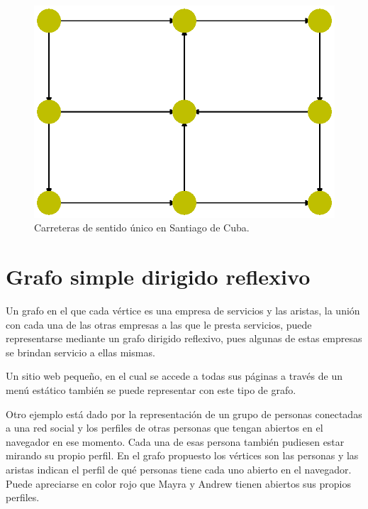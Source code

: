 \documentclass{article}
\begin{document}

\begin{figure}
  \includegraphics[width=.8\columnwidth]{5.eps}
  \caption{Carreteras de sentido único en Santiago de Cuba.}
  \label{fig:5}
\end{figure}
\newpage

\section{Grafo simple dirigido reflexivo}

Un grafo en el que cada vértice es una empresa de servicios y las aristas, la unión con cada una de las otras empresas a las que le presta servicios, puede representarse mediante un grafo dirigido reflexivo, pues algunas de estas empresas se brindan servicio a ellas mismas. 

Un sitio web pequeño, en el cual se accede a todas sus páginas a través de un menú estático también se puede representar con este tipo de grafo. 

Otro ejemplo está dado por la representación de un grupo de personas conectadas a una red social y los perfiles de otras personas que tengan abiertos en el navegador en ese momento. Cada una de esas persona también pudiesen estar mirando su propio
perfil. En el grafo propuesto los vértices son las personas y las aristas indican el perfil de qué personas tiene cada uno abierto en el navegador. Puede apreciarse en color rojo que Mayra y Andrew tienen abiertos sus propios perfiles.
\end{document}
